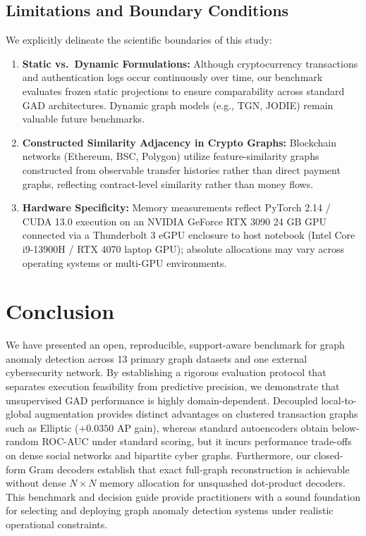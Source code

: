 \documentclass[11pt,a4paper]{article}
\begin{document}
\subsection{Limitations and Boundary Conditions}
We explicitly delineate the scientific boundaries of this study:
\begin{enumerate}
    \item \textbf{Static vs.\ Dynamic Formulations:} Although cryptocurrency transactions and authentication logs occur continuously over time, our benchmark evaluates frozen static projections to ensure comparability across standard GAD architectures. Dynamic graph models (e.g., TGN, JODIE) remain valuable future benchmarks.
    \item \textbf{Constructed Similarity Adjacency in Crypto Graphs:} Blockchain networks (Ethereum, BSC, Polygon) utilize feature-similarity graphs constructed from observable transfer histories rather than direct payment graphs, reflecting contract-level similarity rather than money flows.
    \item \textbf{Hardware Specificity:} Memory measurements reflect PyTorch 2.14 / CUDA 13.0 execution on an NVIDIA GeForce RTX 3090 24 GB GPU connected via a Thunderbolt 3 eGPU enclosure to host notebook (Intel Core i9-13900H / RTX 4070 laptop GPU); absolute allocations may vary across operating systems or multi-GPU environments.
\end{enumerate}

\section{Conclusion}
\label{sec:conclusion}
We have presented an open, reproducible, support-aware benchmark for graph anomaly detection across 13 primary graph datasets and one external cybersecurity network. By establishing a rigorous evaluation protocol that separates execution feasibility from predictive precision, we demonstrate that unsupervised GAD performance is highly domain-dependent. Decoupled local-to-global augmentation provides distinct advantages on clustered transaction graphs such as Elliptic ($+0.0350$ AP gain), whereas standard autoencoders obtain below-random ROC-AUC under standard scoring, but it incurs performance trade-offs on dense social networks and bipartite cyber graphs. Furthermore, our closed-form Gram decoders establish that exact full-graph reconstruction is achievable without dense $N \times N$ memory allocation for unsquashed dot-product decoders. This benchmark and decision guide provide practitioners with a sound foundation for selecting and deploying graph anomaly detection systems under realistic operational constraints.
\end{document}
